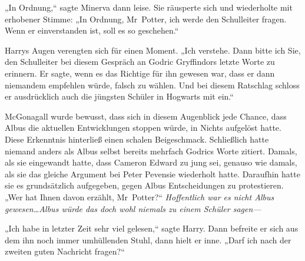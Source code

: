 „In Ordnung,“ sagte Minerva dann leise. Sie räusperte sich und wiederholte mit erhobener Stimme: „In Ordnung, Mr~Potter, ich werde den Schulleiter fragen. Wenn er einverstanden ist, soll es so geschehen.“

Harrys Augen verengten sich für einen Moment. „Ich verstehe. Dann bitte ich Sie, den Schulleiter bei diesem Gespräch an Godric Gryffindors letzte Worte zu erinnern. Er sagte, wenn es das Richtige für ihn gewesen war, dass er dann niemandem empfehlen würde, falsch zu wählen. Und bei diesem Ratschlag schloss er ausdrücklich auch die jüngsten Schüler in Hogwarts mit ein.“

McGonagall wurde bewusst, dass sich in diesem Augenblick jede Chance, dass Albus die aktuellen Entwicklungen stoppen würde, in Nichts aufgelöst hatte. Diese Erkenntnis hinterließ einen schalen Beigeschmack. Schließlich hatte niemand anders als Albus selbst bereits mehrfach Godrics Worte zitiert. Damals, als sie eingewandt hatte, dass Cameron Edward zu jung sei, genauso wie damals, als sie das gleiche Argument bei Peter Pevensie wiederholt hatte. Daraufhin hatte sie es grundsätzlich aufgegeben, gegen Albus Entscheidungen zu protestieren.
„Wer hat Ihnen davon erzählt, Mr~Potter?“ \emph{Hoffentlich war es nicht Albus gewesen…Albus würde das doch wohl niemals zu einem Schüler \emph{sagen}—}

„Ich habe in letzter Zeit sehr viel gelesen,“ sagte Harry. Dann befreite er sich aus dem ihn noch immer umhüllenden Stuhl, dann hielt er inne. „Darf ich nach der zweiten guten Nachricht fragen?“

